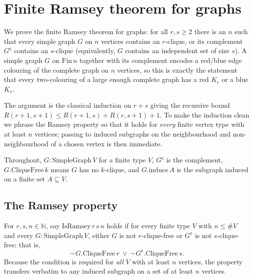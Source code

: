 


\section{Finite Ramsey theorem for graphs}

We prove the finite Ramsey theorem for graphs: for all $r, s \ge 2$ there is an
$n$ such that every simple graph $G$ on $n$ vertices contains an $r$-clique, or
its complement $G^{\mathsf c}$ contains an $s$-clique (equivalently, $G$ contains
an independent set of size $s$). A simple graph $G$ on $\mathrm{Fin}\,n$ together
with its complement encodes a red/blue edge colouring of the complete graph on
$n$ vertices, so this is exactly the statement that every two-colouring of a
large enough complete graph has a red $K_r$ or a blue $K_s$.

The argument is the classical induction on $r + s$ giving the recursive bound
$R(r{+}1, s{+}1) \le R(r{+}1, s) + R(r, s{+}1) + 1$. To make the induction clean
we phrase the Ramsey property so that it holds for \emph{every} finite vertex
type with at least $n$ vertices; passing to induced subgraphs on the
neighbourhood and non-neighbourhood of a chosen vertex is then immediate.

Throughout, $G : \mathrm{SimpleGraph}\, V$ for a finite type $V$, $G^{\mathsf c}$
is the complement, $G.\mathrm{CliqueFree}\,k$ means $G$ has no $k$-clique, and
$G.\mathrm{induce}\,A$ is the subgraph induced on a finite set $A \subseteq V$.

\subsection{The Ramsey property}

\begin{definition}
    \label{def:is-ramsey}
    For $r, s, n \in \mathbb{N}$, say \emph{$\mathrm{IsRamsey}\, r\, s\, n$} holds
    if for every finite type $V$ with $n \le \#V$ and every
    $G : \mathrm{SimpleGraph}\, V$, either $G$ is not $r$-clique-free or
    $G^{\mathsf c}$ is not $s$-clique-free; that is,
    \[
        \neg\, G.\mathrm{CliqueFree}\, r \ \lor\ \neg\, G^{\mathsf c}.\mathrm{CliqueFree}\, s .
    \]
    Because the condition is required for \emph{all} $V$ with at least $n$
    vertices, the property transfers verbatim to any induced subgraph on a set of
    at least $n$ vertices.
\end{definition}

